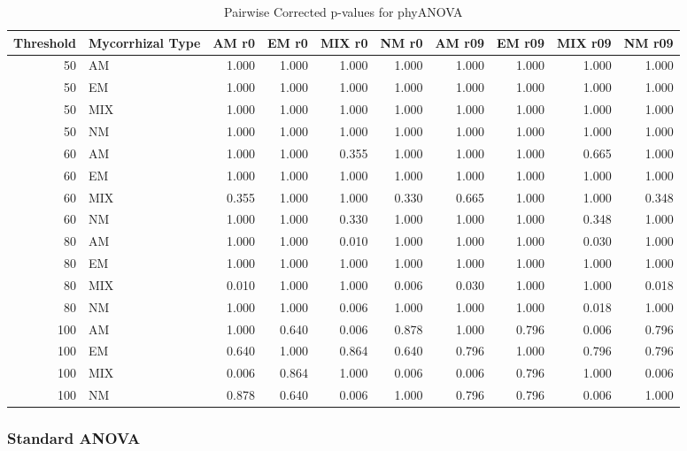 \documentclass[]{article}
\begin{document}
\begin{table}[H]

\caption{\label{tab:unnamed-chunk-19}Pairwise Corrected p-values for phyANOVA}
\centering
\begin{tabular}{r|l|r|r|r|r|r|r|r|r}
\hline
Threshold & Mycorrhizal Type & AM r0 & EM r0 & MIX r0 & NM r0 & AM r09 & EM r09 & MIX r09 & NM r09\\
\hline
50 & AM & 1.000 & 1.000 & 1.000 & 1.000 & 1.000 & 1.000 & 1.000 & 1.000\\
\hline
50 & EM & 1.000 & 1.000 & 1.000 & 1.000 & 1.000 & 1.000 & 1.000 & 1.000\\
\hline
50 & MIX & 1.000 & 1.000 & 1.000 & 1.000 & 1.000 & 1.000 & 1.000 & 1.000\\
\hline
50 & NM & 1.000 & 1.000 & 1.000 & 1.000 & 1.000 & 1.000 & 1.000 & 1.000\\
\hline
60 & AM & 1.000 & 1.000 & 0.355 & 1.000 & 1.000 & 1.000 & 0.665 & 1.000\\
\hline
60 & EM & 1.000 & 1.000 & 1.000 & 1.000 & 1.000 & 1.000 & 1.000 & 1.000\\
\hline
60 & MIX & 0.355 & 1.000 & 1.000 & 0.330 & 0.665 & 1.000 & 1.000 & 0.348\\
\hline
60 & NM & 1.000 & 1.000 & 0.330 & 1.000 & 1.000 & 1.000 & 0.348 & 1.000\\
\hline
80 & AM & 1.000 & 1.000 & 0.010 & 1.000 & 1.000 & 1.000 & 0.030 & 1.000\\
\hline
80 & EM & 1.000 & 1.000 & 1.000 & 1.000 & 1.000 & 1.000 & 1.000 & 1.000\\
\hline
80 & MIX & 0.010 & 1.000 & 1.000 & 0.006 & 0.030 & 1.000 & 1.000 & 0.018\\
\hline
80 & NM & 1.000 & 1.000 & 0.006 & 1.000 & 1.000 & 1.000 & 0.018 & 1.000\\
\hline
100 & AM & 1.000 & 0.640 & 0.006 & 0.878 & 1.000 & 0.796 & 0.006 & 0.796\\
\hline
100 & EM & 0.640 & 1.000 & 0.864 & 0.640 & 0.796 & 1.000 & 0.796 & 0.796\\
\hline
100 & MIX & 0.006 & 0.864 & 1.000 & 0.006 & 0.006 & 0.796 & 1.000 & 0.006\\
\hline
100 & NM & 0.878 & 0.640 & 0.006 & 1.000 & 0.796 & 0.796 & 0.006 & 1.000\\
\hline
\end{tabular}
\end{table}

\hypertarget{standard-anova-3}{%
\subsubsection{Standard ANOVA}\label{standard-anova-3}}
\end{document}
